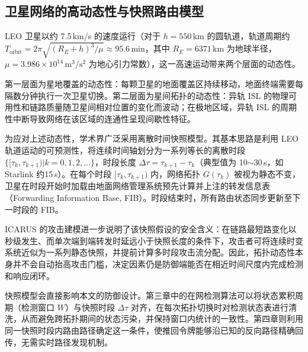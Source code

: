 
\subsection{卫星网络的高动态性与快照路由模型}

LEO 卫星以约 7.5\,km/s 的速度运行（对于 $h=550$\,km 的圆轨道，轨道周期约 $T_{\text{orbit}} = 2\pi\sqrt{(R_E+h)^3/\mu} \approx 95.6$\,min，其中 $R_E = 6371$\,km 为地球半径，$\mu = 3.986 \times 10^{14}\,\text{m}^3/\text{s}^2$ 为地心引力常数），这一高速运动带来两个层面的动态性。

第一层面为星地覆盖的动态性：每颗卫星的地面覆盖区持续移动，地面终端需要每隔数分钟执行一次卫星切换。第二层面为星间拓扑的动态性：异轨 ISL 的物理可用性和链路质量随卫星间相对位置的变化而波动；在极地区域，异轨 ISL 的周期性中断导致网络在该区域的连通性呈现间歇性特征。

为应对上述动态性，学术界广泛采用离散时间快照模型。其基本思路是利用 LEO 轨道运动的可预测性，将连续时间轴划分为一系列等长的离散时段 $\{[\tau_k, \tau_{k+1}) | k=0,1,2,\ldots\}$，时段长度 $\Delta\tau = \tau_{k+1} - \tau_k$（典型值为 10$\sim$30\,s，如 Starlink 约15\,s）。在每个时段 $[\tau_k, \tau_{k+1})$ 内，网络拓扑 $G(\tau_k)$ 被视为静态不变，卫星在时段开始时加载由地面网络管理系统预先计算并上注的转发信息表（Forwarding Information Base, FIB）。时段结束时，所有路由状态同步更新至下一时段的 FIB。

ICARUS 的攻击建模进一步说明了该快照假设的安全含义：在链路最短路变化以秒级发生、而单次端到端转发时延远小于快照长度的条件下，攻击者可将连续时变系统近似为一系列静态快照，并提前计算多时段攻击流分配。因此，拓扑动态性本身并不会自动抬高攻击门槛，决定因素仍是防御端能否在相近时间尺度内完成检测和响应闭环。

快照模型会直接影响本文的防御设计。第三章中的在网检测算法可以将状态累积周期（检测窗口 $W$）与快照时段 $\Delta\tau$ 对齐，在每次拓扑切换时对检测状态表进行清洗，从而避免跨拓扑期间的状态污染，并保持窗口内统计的一致性。第四章则利用同一快照时段内路由路径确定这一条件，使推回令牌能够沿已知的反向路径精确回传，无需实时路径发现机制。


